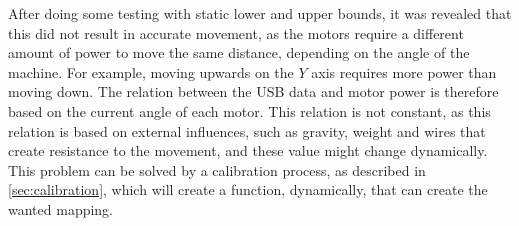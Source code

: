 After doing some testing with static lower and upper bounds, it was revealed that this did not result in accurate movement, as the motors require a different amount of power to move the same distance, depending on the angle of the machine.
For example, moving upwards on the $Y$ axis requires more power than moving down.
The relation between the USB data and motor power is therefore based on the current angle of each motor.
This relation is not constant, as this relation is based on external influences, such as gravity, weight and wires that create resistance to the movement, and these value might change dynamically.
This problem can be solved by a calibration process, as described in \autoref{sec:calibration}, which will create a function, dynamically, that can create the wanted mapping.